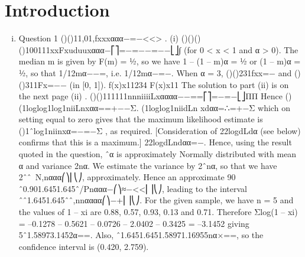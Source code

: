 \documentclass{article}
\author{kobriendublin }
\date{December 2018}
\begin{document}
\section{Introduction}
\begin{enumerate}[(i)]
\item
Question 1
()()11,01,fxxxααα−=−<<> .
(i) ()()()()100111xxFxuduuxααα−⎡⎤=−=−−=−−⎣⎦∫ (for 0 < x < 1 and α > 0).
The median m is given by F(m) = ½, so we have 1 – (1 – m)α = ½ or (1 – m)α = ½, so that 1/12mα−−=, i.e. 1/12mα−=−.
When α = 3, ()()231fxx=− and ()()311Fx=−− (in [0, 1]).
f(x)x11234
F(x)x11
The solution to part (ii) is on the next page
(ii) . ()()111111nnniiiiLxαααα−−==⎡⎤=−=−⎣⎦ΠΠ
Hence ()(1loglog1log1niiLnxαα==+−−Σ.
(1loglog1niidLn xdαα=∴=+−Σ which on setting equal to zero gives that the maximum likelihood estimate is ()1ˆlog1niinxα=−=−Σ , as required. [Consideration of 22logdLdα (see below) confirms that this is a maximum.]
22logdLndαα=−. Hence, using the result quoted in the question, ˆα is approximately Normally distributed with mean α and variance 2nα. We estimate the variance by 2ˆnα,
so that we have 2ˆˆ~N,nααα⎛⎞⎜⎝⎠, approximately.
Hence an approximate 90%
ˆ0.901.6451.645ˆ/Pnααα−⎛⎞≈−<<⎜⎟⎝⎠,
leading to the interval ˆˆ1.6451.645ˆˆ,nnαααα⎛⎞−+⎜⎟⎝⎠.
For the given sample, we have n = 5 and the values of 1 – xi are 0.88, 0.57, 0.93, 0.13 and 0.71. Therefore
Σlog(1 – xi) = –0.1278 – 0.5621 – 0.0726 – 2.0402 – 0.3425 = –3.1452
giving 5ˆ1.58973.1452α==.
Also, ˆ1.6451.6451.58971.16955nα×==, so the confidence interval is (0.420, 2.759).
\end{enumerate}
\end{document}
